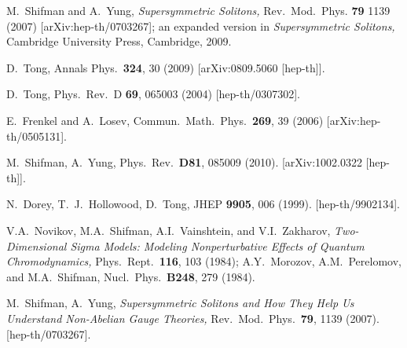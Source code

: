 \documentclass[epsfig,12pt]{article}
\begin{document}
\begin{thebibliography}{99}
M.~Shifman and A.~Yung,
{\sl Supersymmetric Solitons,}
Rev.\ Mod.\ Phys. {\bf 79} 1139 (2007)
[arXiv:hep-th/0703267]; an expanded version in {\sl Supersymmetric Solitons,}
Cambridge University Press, Cambridge, 2009.

D.~Tong,
  Annals Phys.\  {\bf 324}, 30 (2009)
  [arXiv:0809.5060 [hep-th]].


D.~Tong,
Phys.\ Rev.\ D {\bf 69}, 065003 (2004)
[hep-th/0307302].
  

  
E.~Frenkel and A.~Losev,
  Commun.\ Math.\ Phys.\  {\bf 269}, 39 (2006)
  [arXiv:hep-th/0505131].
  
  M.~Shifman, A.~Yung,
  Phys.\ Rev.\  {\bf D81}, 085009 (2010).
  [arXiv:1002.0322 [hep-th]].

  N.~Dorey, T.~J.~Hollowood, D.~Tong,
  JHEP {\bf 9905}, 006 (1999).
  [hep-th/9902134].

  V.A.~Novikov, M.A.~Shifman, A.I.~Vainshtein, and V.I.~Zakharov,
 {\em Two-Dimensional Sigma Models: Modeling Nonperturbative Effects of Quantum Chromodynamics,}
  Phys.\ Rept.\  {\bf 116}, 103 (1984);  A.Y.~Morozov, A.M.~Perelomov, and M.A.~Shifman,
  Nucl.\ Phys.\  {\bf B248}, 279 (1984).
  
  M.~Shifman, A.~Yung,
{\em Supersymmetric Solitons and How They Help Us Understand Non-Abelian Gauge Theories,}
  Rev.\ Mod.\ Phys.\  {\bf 79}, 1139 (2007).
  [hep-th/0703267].

\end{thebibliography}
\end{document}
